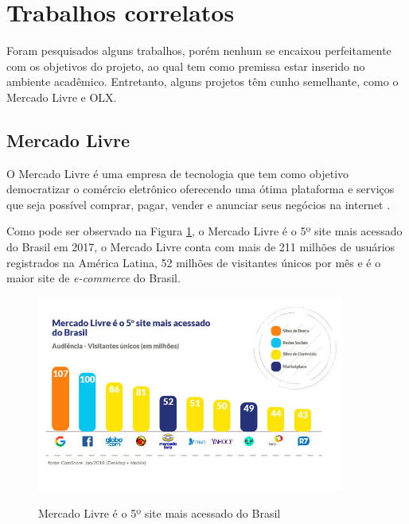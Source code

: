 \section{Trabalhos correlatos}
\label{sec:java}

Foram pesquisados alguns trabalhos, porém nenhum se encaixou perfeitamente com os objetivos do projeto, ao qual tem como premissa estar inserido no ambiente acadêmico. Entretanto, alguns projetos têm cunho semelhante, como o Mercado Livre e OLX. \par

\subsection{Mercado Livre}

O Mercado Livre é uma empresa de tecnologia que tem como objetivo democratizar o comércio eletrônico oferecendo uma ótima plataforma e serviços que seja possível comprar, pagar, vender e anunciar seus negócios na internet \cite{brasil_2019}.

Como pode ser observado na Figura \ref{fig:livre_5}, o Mercado Livre é o 5º site mais acessado do Brasil em 2017, o Mercado Livre conta com mais de 211 milhões de usuários registrados na América Latina, 52 milhões de visitantes únicos por mês e é o maior site de \textit{e-commerce} do Brasil.

\begin{figure}[htbp!]
  \centering
  \caption{Mercado Livre é o 5º site mais acessado do Brasil}
  \includegraphics[width=0.9\textwidth]{figs/ml1.jpg}
    \label{fig:livre_5}
\end{figure}

